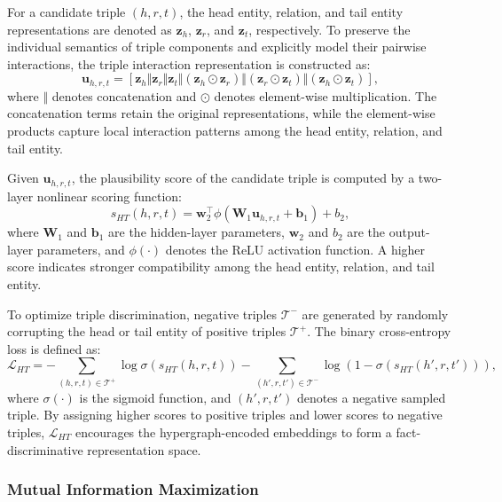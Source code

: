 \documentclass[a4paper,fleqn]{cas-sc}
\begin{document}
For a candidate triple $(h,r,t)$, the head entity, relation, and tail entity representations are denoted as $\mathbf{z}_{h}$, $\mathbf{z}_{r}$, and $\mathbf{z}_{t}$, respectively. To preserve the individual semantics of triple components and explicitly model their pairwise interactions, the triple interaction representation is constructed as:
\begin{equation}
\mathbf{u}_{h,r,t}
=
\left[
\mathbf{z}_{h}
\Vert
\mathbf{z}_{r}
\Vert
\mathbf{z}_{t}
\Vert
(\mathbf{z}_{h}\odot\mathbf{z}_{r})
\Vert
(\mathbf{z}_{r}\odot\mathbf{z}_{t})
\Vert
(\mathbf{z}_{h}\odot\mathbf{z}_{t})
\right],
\end{equation}
where $\Vert$ denotes concatenation and $\odot$ denotes element-wise multiplication. The concatenation terms retain the original representations, while the element-wise products capture local interaction patterns among the head entity, relation, and tail entity.

Given $\mathbf{u}_{h,r,t}$, the plausibility score of the candidate triple is computed by a two-layer nonlinear scoring function:
\begin{equation}
s_{HT}(h,r,t)
=
\mathbf{w}_{2}^{\top}
\phi
\left(
\mathbf{W}_{1}\mathbf{u}_{h,r,t}
+
\mathbf{b}_{1}
\right)
+
b_{2},
\end{equation}
where $\mathbf{W}_{1}$ and $\mathbf{b}_{1}$ are the hidden-layer parameters, $\mathbf{w}_{2}$ and $b_{2}$ are the output-layer parameters, and $\phi(\cdot)$ denotes the ReLU activation function. A higher score indicates stronger compatibility among the head entity, relation, and tail entity.

To optimize triple discrimination, negative triples $\mathcal{T}^{-}$ are generated by randomly corrupting the head or tail entity of positive triples $\mathcal{T}^{+}$. The binary cross-entropy loss is defined as:
\begin{equation}
\mathcal{L}_{HT}
=
-\sum_{(h,r,t)\in\mathcal{T}^{+}}
\log
\sigma
\left(
s_{HT}(h,r,t)
\right)
-
\sum_{(h',r,t')\in\mathcal{T}^{-}}
\log
\left(
1-
\sigma
\left(
s_{HT}(h',r,t')
\right)
\right),
\end{equation}
where $\sigma(\cdot)$ is the sigmoid function, and $(h',r,t')$ denotes a negative sampled triple. By assigning higher scores to positive triples and lower scores to negative triples, $\mathcal{L}_{HT}$ encourages the hypergraph-encoded embeddings to form a fact-discriminative representation space.

\subsubsection{Mutual Information Maximization}
\end{document}
